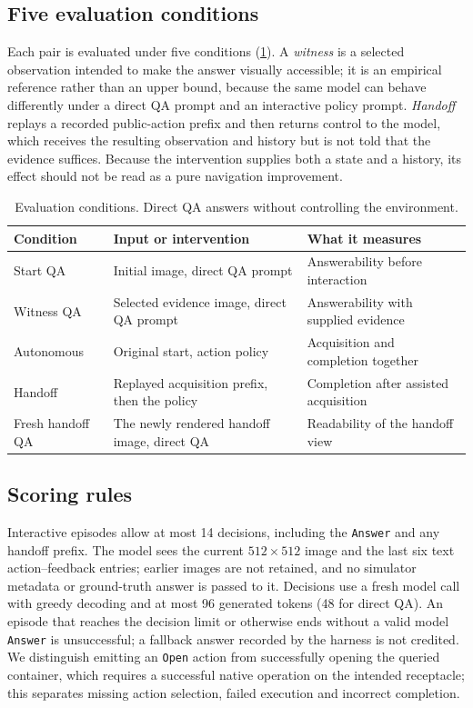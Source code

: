 \documentclass{article}
\begin{document}
\subsection{Five evaluation conditions}
Each pair is evaluated under five conditions (\cref{tab:conditions}). A \emph{witness} is a selected observation intended to make the answer visually accessible; it is an empirical reference rather than an upper bound, because the same model can behave differently under a direct QA prompt and an interactive policy prompt. \emph{Handoff} replays a recorded public-action prefix and then returns control to the model, which receives the resulting observation and history but is not told that the evidence suffices. Because the intervention supplies both a state and a history, its effect should not be read as a pure navigation improvement.

\begin{table}[t]
\centering
\caption{Evaluation conditions. Direct QA answers without controlling the environment.}
\label{tab:conditions}
\small
\begin{tabular}{p{2.5cm}p{5.3cm}p{4.9cm}}
\toprule
Condition & Input or intervention & What it measures \\
\midrule
Start QA & Initial image, direct QA prompt & Answerability before interaction \\
Witness QA & Selected evidence image, direct QA prompt & Answerability with supplied evidence \\
Autonomous & Original start, action policy & Acquisition and completion together \\
Handoff & Replayed acquisition prefix, then the policy & Completion after assisted acquisition \\
Fresh handoff QA & The newly rendered handoff image, direct QA & Readability of the handoff view \\
\bottomrule
\end{tabular}
\end{table}

\subsection{Scoring rules}
Interactive episodes allow at most 14 decisions, including the \texttt{Answer} and any handoff prefix. The model sees the current $512\times512$ image and the last six text action--feedback entries; earlier images are not retained, and no simulator metadata or ground-truth answer is passed to it. Decisions use a fresh model call with greedy decoding and at most 96 generated tokens (48 for direct QA). An episode that reaches the decision limit or otherwise ends without a valid model \texttt{Answer} is unsuccessful; a fallback answer recorded by the harness is not credited. We distinguish emitting an \texttt{Open} action from successfully opening the queried container, which requires a successful native operation on the intended receptacle; this separates missing action selection, failed execution and incorrect completion.
\end{document}
